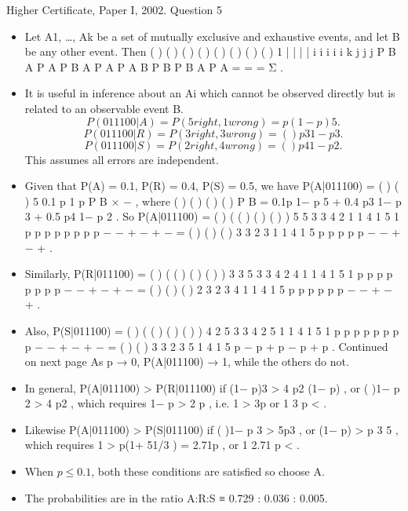 \documentclass[a4paper,12pt]{article}
\begin{document}
Higher Certificate, Paper I, 2002. Question 5
\begin{itemize}
\item Let A1, …, Ak be a set of mutually exclusive and exhaustive events, and let B be any
other event.
Then ( ) ( ) ( )
( )
( ) ( )
( ) ( )
1
| |
|
|
i i i i
i k
j j
j
P B A P A P B A P A
P A B
P B P B A P A
=
= =
Σ
.
\item It is useful in inference about an Ai which cannot be observed directly but is related to
an observable event B.
\[P(011100|A) = P(5 right, 1 wrong) = p(1− p)5 .\]
\[P(011100|R) = P(3 right, 3 wrong) = ( )p3 1− p 3 .\]
\[P(011100|S) = P(2 right, 4 wrong) = ( )p4 1− p 2 .\]
This assumes all errors are independent.
\item Given that P(A) = 0.1, P(R) = 0.4, P(S) = 0.5, we have P(A|011100) = ( )
( )
5 0.1 p 1 p
P B
× −
,
where ( ) ( ) ( ) ( ) P B = 0.1p 1− p 5 + 0.4 p3 1− p 3 + 0.5 p4 1− p 2 .
So P(A|011100) = ( )
( ( ) ( ) ( ) )
5
5 3 3 4 2
1
1 4 1 5 1
p p
p p p p p p
−
− + − + −
= ( )
( ) ( )
3
3 2 3
1
1 4 1 5
p
p p p p
−
− + − +
.
\item Similarly, P(R|011100) = ( )
( ( ) ( ) ( ) )
3 3
5 3 3 4 2
4 1
1 4 1 5 1
p p
p p p p p p
−
− + − + −
= ( )
( ) ( )
2
3 2 3
4 1
1 4 1 5
p p
p p p p
−
− + − +
.
\item Also, P(S|011100) = ( )
( ( ) ( ) ( ) )
4 2
5 3 3 4 2
5 1
1 4 1 5 1
p p
p p p p p p
−
− + − + −
=
( ) ( )
3
3 2 3
5
1 4 1 5
p
− p + p − p + p
.
Continued on next page
As p → 0, P(A|011100) → 1, while the others do not.
\item In general, P(A|011100) > P(R|011100) if (1− p)3 > 4 p2 (1− p) , or ( )1− p 2 > 4 p2 ,
which requires 1− p > 2 p , i.e. 1 > 3p or 1
3 p < .
\item Likewise P(A|011100) > P(S|011100) if ( )1− p 3 > 5p3 , or (1− p) > p 3 5 , which
requires 1 > p(1+ 51/3 ) = 2.71p , or 1
2.71
p < .
\item When $p \leq 0.1$, both these conditions are satisfied so choose A.
\item The probabilities are in the ratio A:R:S ≡ 0.729 : 0.036 : 0.005.
\end{itemize}
\end{document}
